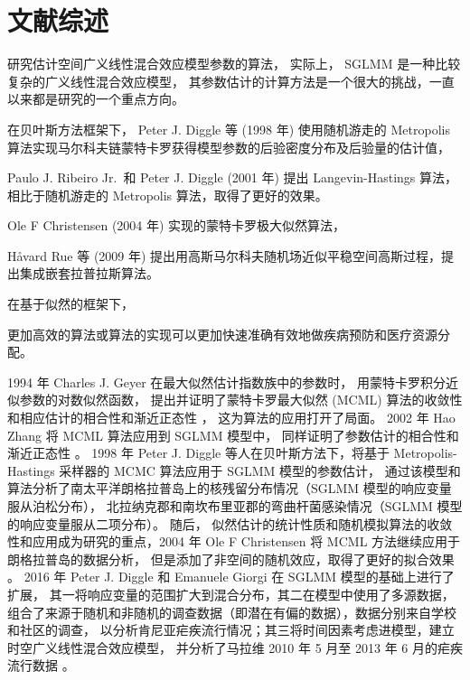 \documentclass[12pt,a4paper,UTF8,twoside]{book}
\theoremstyle{definition}
\theoremstyle{definition}
\theoremstyle{definition}
\theoremstyle{remark}
\begin{document}
\hypertarget{reviews}{%
\section{文献综述}\label{reviews}}

研究估计空间广义线性混合效应模型参数的算法， 实际上， SGLMM
是一种比较复杂的广义线性混合效应模型，
其参数估计的计算方法是一个很大的挑战，一直以来都是研究的一个重点方向。

在贝叶斯方法框架下， Peter J. Diggle 等 (1998 年) \citep{Diggle1998}
使用随机游走的 Metropolis
算法实现马尔科夫链蒙特卡罗获得模型参数的后验密度分布及后验量的估计值，

Paulo J. Ribeiro Jr.~和 Peter J. Diggle (2001 年) \citep{geoR2001} 提出
Langevin-Hastings 算法，相比于随机游走的 Metropolis
算法，取得了更好的效果。

Ole F Christensen (2004 年) \citep{Christensen2004}
实现的蒙特卡罗极大似然算法，

Håvard Rue 等 (2009 年) \citep{Rue2009}
提出用高斯马尔科夫随机场近似平稳空间高斯过程，提出集成嵌套拉普拉斯算法。

在基于似然的框架下，

更加高效的算法或算法的实现可以更加快速准确有效地做疾病预防和医疗资源分配。

1994 年 Charles J. Geyer 在最大似然估计指数族中的参数时，
用蒙特卡罗积分近似参数的对数似然函数， 提出并证明了蒙特卡罗最大似然
(MCML) 算法的收敛性和相应估计的相合性和渐近正态性 \citep{Geyer1994On}，
这为算法的应用打开了局面。 2002 年 Hao Zhang 将 MCML 算法应用到 SGLMM
模型中， 同样证明了参数估计的相合性和渐近正态性 \citep{Zhang2002On}。
1998 年 Peter J. Diggle 等人在贝叶斯方法下，将基于 Metropolis-Hastings
采样器的 MCMC 算法应用于 SGLMM 模型的参数估计，
通过该模型和算法分析了南太平洋朗格拉普岛上的核残留分布情况（SGLMM
模型的响应变量服从泊松分布），
北拉纳克郡和南坎布里亚郡的弯曲杆菌感染情况（SGLMM
模型的响应变量服从二项分布）\citep{Diggle1998}。 随后，
似然估计的统计性质和随机模拟算法的收敛性和应用成为研究的重点，2004 年
Ole F Christensen 将 MCML 方法继续应用于朗格拉普岛的数据分析，
但是添加了非空间的随机效应，取得了更好的拟合效果
\citep{Christensen2004}。 2016 年 Peter J. Diggle 和 Emanuele Giorgi 在
SGLMM 模型的基础上进行了扩展，
其一将响应变量的范围扩大到混合分布，其二在模型中使用了多源数据，
组合了来源于随机和非随机的调查数据（即潜在有偏的数据），数据分别来自学校和社区的调查，
以分析肯尼亚疟疾流行情况；其三将时间因素考虑进模型，建立时空广义线性混合效应模型，
并分析了马拉维 2010 年 5 月至 2013 年 6 月的疟疾流行数据
\citep{Diggle2016}。
\end{document}

